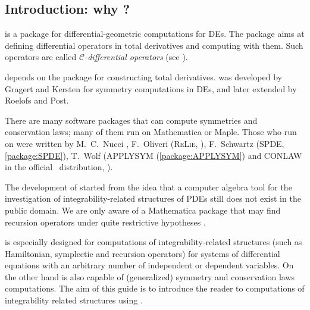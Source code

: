 \subsection{Introduction: why \cde?}
\label{cdesec:why-cde}

\cde is a \REDUCE package for differential-geometric computations for DEs. The
package aims at defining differential operators in total derivatives and
computing with them. Such operators are called \emph{$\mathcal{C}$-differential
  operators} (see \cite{Krasilshchik:99}).

\cde depends on the \REDUCE package \cdiff for constructing total
derivatives. \cdiff was developed by Gragert and Kersten for symmetry
computations in DEs, and later extended by Roelofs and Post.

There are many software packages that can compute symmetries and conservation
laws; many of them run on Mathematica or Maple. Those who run on \REDUCE were
written by M.~C.~Nucci \cite{Nucci:92,Nucci:96}, F.~Oliveri (\textsc{ReLie},
\cite{Oliveri:ReLie}), F.~Schwartz (SPDE, \ref{package:SPDE}), T.~Wolf
(APPLYSYM (\ref{package:APPLYSYM}) and CONLAW in the official \REDUCE\ distribution,
\cite{Wolf:99d,Wolf:APPLYSYM,Brand:95,Brand:92}).

The development of \cde started from the idea that a computer algebra tool
for the investigation of integrability-related structures of PDEs still does
not exist in the public domain. We are only aware of a Mathematica package that
may find recursion operators under quite restrictive hypotheses \cite{BaldwinHereman:2010}.

\cde is especially designed for computations of integrability-related
structures (such as Hamiltonian, symplectic and recursion operators) for
systems of differential equations with an arbitrary number of independent or
dependent variables. On the other hand \cde is also capable of (generalized)
symmetry and conservation laws computations.  The aim of this guide is to
introduce the reader to computations of integrability related structures using
\cde.

